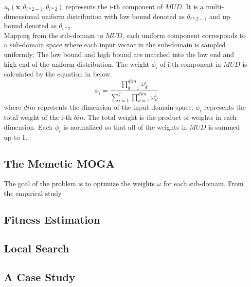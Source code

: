 \documentclass[conference]{IEEEtran}
\renewcommand{\vec}[1]{\mathbf{#1}}
\begin{document}
\(u_{i}(\vec{x},\theta_{i*2-1},\theta_{i*2})\) represents the i-th component of \(MUD\). It is a multi-dimensional uniform distribution with low bound denoted as \(\theta_{i*2-1}\) and up bound denoted as \(\theta_{i*2}\).\\


Mapping from the sub-domain to \(MUD\), each uniform component corresponds to a sub-domain space where each input vector in the sub-domain is sampled uniformly; The low bound and high bound are matched into the low end and high end of the uniform distribution. The weight \(\phi_{i}\) of i-th component in \(MUD\) is calculated by the equation in below.
\begin{equation}
\phi_{i} = \frac{\prod_{d=1}^{dim}\omega_{d}^i}{\sum_{i = 1}^{j} \prod_{d=1}^{dim}\omega_{d}^i}
\end{equation}
where \(dim\) represents the dimension of the input domain space. \(\phi_{i}\) represents the total weight of the i-th \(bin\). The total weight is the product of weights in each dimension. Each \(\phi_{i}\) is normalized so that all of the weights in \(MUD\) is summed up to 1.

\subsection{The Memetic MOGA}
The goal of the problem is to optimize the weights \(\omega\) for each sub-domain. From the empirical study
\subsection{Fitness Estimation}
\subsection{Local Search}
\subsection{A Case Study}
\end{document}
